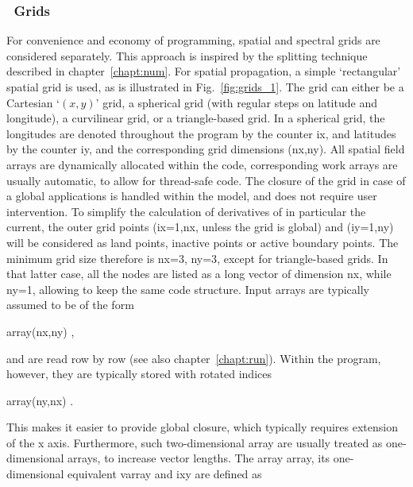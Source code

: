 \vsssub
\subsubsection{~Grids} \label{sec:grids}
\vsssub




For convenience and economy of programming, spatial and spectral grids are
considered separately. This approach is inspired by the splitting technique
described in chapter~\ref{chapt:num}. For spatial propagation, a simple
`rectangular' spatial grid is used, as is illustrated in
Fig.~\ref{fig:grids_1}. The grid can either be a Cartesian `$(x,y)$' grid, a
spherical grid (with regular steps on latitude and longitude), a curvilinear
grid, or a triangle-based grid. In a spherical grid, the longitudes are
denoted throughout the program by the counter {\F ix}, and latitudes by the
counter {\F iy}, and the corresponding grid dimensions {\F (nx,ny)}. All
spatial field arrays are dynamically allocated within the code, corresponding
work arrays are usually automatic, to allow for thread-safe code. The closure
of the grid in case of a global applications is handled within the model, and
does not require user intervention. To simplify the calculation of derivatives
of in particular the current, the outer grid points ({\F ix=1,nx}, unless the
grid is global) and ({\F iy=1,ny}) will be considered as land points, inactive
points or active boundary points. The minimum grid size therefore is {\F nx=3,
  ny=3}, except for triangle-based grids. In that latter case, all the nodes
are listed as a long vector of dimension {\F nx}, while {\F ny=1}, allowing to keep the
same code structure. Input arrays are typically assumed to be of the form

\vspace{\baselineskip} \centerline{\F array(nx,ny) ,} \vspace{\baselineskip}

\noindent
and are read row by row (see also chapter~\ref{chapt:run}). Within the
program, however, they are typically stored with rotated indices

\vspace{\baselineskip} \centerline{\F array(ny,nx) .} \vspace{\baselineskip}

\noindent
This makes it easier to provide global closure, which typically requires
extension of the x axis. Furthermore, such two-dimensional array are usually
treated as one-dimensional arrays, to increase vector lengths. The array {\F
array}, its one-dimensional equivalent {\F varray} and {\F ixy} are defined as

